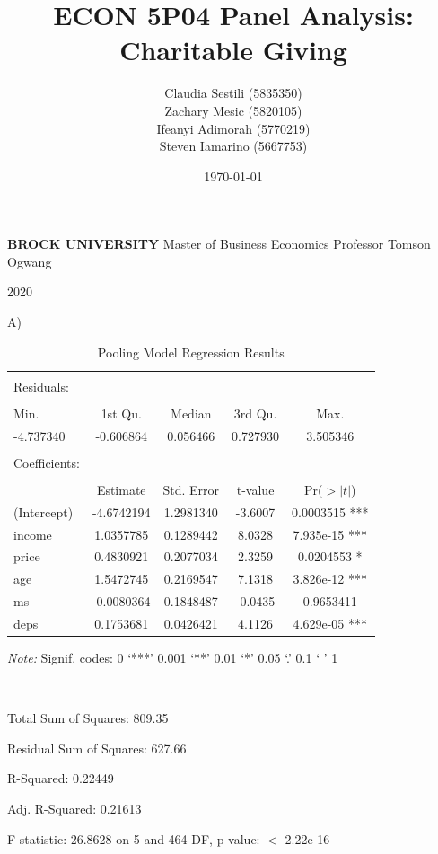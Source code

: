 \documentclass[12pt]{article}
\begin{document}
\title{\textbf{ECON 5P04 Panel Analysis: Charitable Giving}}
\author{Claudia Sestili (5835350) \\ Zachary Mesic (5820105) \\ Ifeanyi Adimorah (5770219) \\ Steven Iamarino (5667753)}
\date{\today}
\maketitle

\thispagestyle{empty}
\vfill
\begin{center}
\textbf{BROCK UNIVERSITY}
\break
Master of Business  Economics
\break
Professor Tomson Ogwang

2020
\end{center}

\newpage

A) 
\begin{table}[!htbp] \centering 
\begin{threeparttable}
  \caption{Pooling Model Regression Results} 
  \label{} 
\begin{tabular}{@{\extracolsep{3pt}}lcccc} 
 \toprule
\midrule
\\
Residuals: \\
\hline \\[-1.8ex] 
     Min. &  1st Qu.  &  Median &  3rd Qu.   &   Max. \\
-4.737340 & -0.606864 & 0.056466 & 0.727930 & 3.505346 \\
 & \\ 
Coefficients: \\
\hline \\[-1.8ex] 
       &       Estimate & Std. Error & t-value  & Pr($>|t|$)  \\
(Intercept) & -4.6742194  & 1.2981340 & -3.6007 & 0.0003515 *** \\
income    &   1.0357785  & 0.1289442  & 8.0328 & 7.935e-15 *** \\
price  &      0.4830921  & 0.2077034  & 2.3259 & 0.0204553 *  \\
age     &     1.5472745 & 0.2169547 & 7.1318 & 3.826e-12 *** \\
ms      &    -0.0080364  & 0.1848487 & -0.0435 & 0.9653411   \\
deps   &      0.1753681  & 0.0426421  & 4.1126 & 4.629e-05 *** \\
\bottomrule
	 \end{tabular}
 \begin{tablenotes}
\small
\item \textit{Note:} Signif. codes:  0 ‘***’ 0.001 ‘**’ 0.01 ‘*’ 0.05 ‘.’ 0.1 ‘ ’ 1
\item \ 
\item Total Sum of Squares:    809.35 
\item Residual Sum of Squares: 627.66 
\item R-Squared:      0.22449 
\item Adj. R-Squared: 0.21613 
\item F-statistic: 26.8628 on 5 and 464 DF, p-value: $<$ 2.22e-16 
\end{tablenotes}
  \end{threeparttable}
\end{table}
\end{document}
